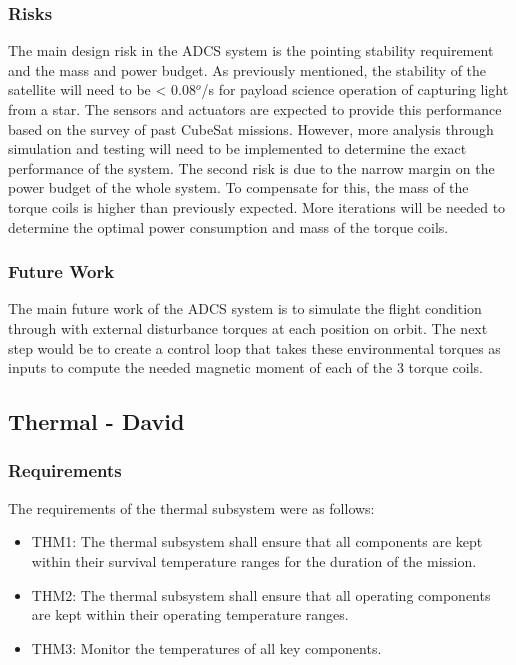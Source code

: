 \documentclass[12pt]{article}
\begin{document}
			\subsubsection{Risks}
			The main design risk in the ADCS system is the pointing stability requirement and the mass and power budget. As previously mentioned, the stability of the satellite will need to be < 0.08$^o$/s for payload science operation of capturing light from a star. The sensors and actuators are expected to provide this performance based on the survey of past CubeSat missions. However, more analysis through simulation and testing will need to be implemented to determine the exact performance of the system. The second risk is due to the narrow margin on the power budget of the whole system. To compensate for this, the mass of the torque coils is higher than previously expected. More iterations will be needed to determine the optimal power consumption and mass of the torque coils. 
			\subsubsection{Future Work}
			The main future work of the ADCS system is to simulate the flight condition through with external disturbance torques at each position on orbit. The next step would be to create a control loop that takes these environmental torques as inputs to compute the needed magnetic moment of each of the 3 torque coils. 


		\subsection{Thermal - David}
		
\subsubsection{Requirements}

The requirements of the thermal subsystem were as follows:

\begin{itemize}
	\item THM1: The thermal subsystem shall ensure that all components are kept within their survival
temperature ranges for the duration of the mission.
\item THM2: The thermal subsystem shall ensure that all operating components are kept within their
operating temperature ranges.
\item THM3: Monitor the temperatures of all key components.
\end{itemize}
\end{document}
